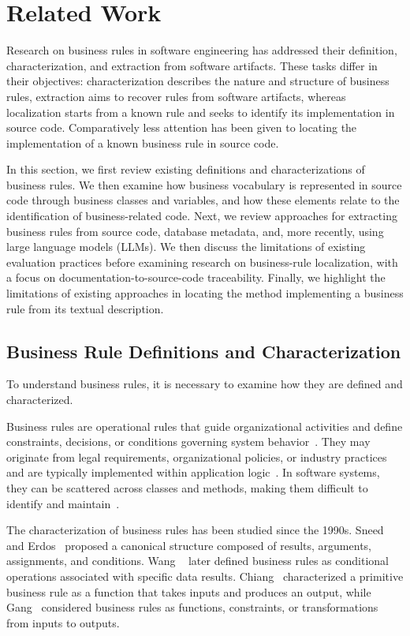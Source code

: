 \section{Related Work}
\label{sec:relatedWork}

Research on business rules in software engineering has addressed their definition, characterization, and extraction from software artifacts. These tasks differ in their objectives: characterization describes the nature and structure of business rules, extraction aims to recover rules from software artifacts, whereas localization starts from a known rule and seeks to identify its implementation in source code. Comparatively less attention has been given to locating the implementation of a known business rule in source code.

In this section, we first review existing definitions and characterizations of business rules. We then examine how business vocabulary is represented in source code through business classes and variables, and how these elements relate to the identification of business-related code. Next, we review approaches for extracting business rules from source code, database metadata, and, more recently, using large language models (LLMs). We then discuss the limitations of existing evaluation practices before examining research on business-rule localization, with a focus on documentation-to-source-code traceability. Finally, we highlight the limitations of existing approaches in locating the method implementing a business rule from its textual description.

\subsection{Business Rule Definitions and Characterization}

To understand business rules, it is necessary to examine how they are defined and characterized.

Business rules are operational rules that guide organizational activities and define constraints, decisions, or conditions governing system behavior~\cite{Huan96a}. They may originate from legal requirements, organizational policies, or industry practices and are typically implemented within application logic~\cite{Wang08b}. In software systems, they can be scattered across classes and methods, making them difficult to identify and maintain~\cite{Cose13a}.

The characterization of business rules has been studied since the 1990s. Sneed and Erdos~\cite{Snee96a} proposed a canonical structure composed of results, arguments, assignments, and conditions. Wang \etal~\cite{Wang08b,Wang04b,Wang04a} later defined business rules as conditional operations associated with specific data results. Chiang~\cite{Chia06a} characterized a primitive business rule as a function that takes inputs and produces an output, while Gang~\cite{Gang09a} considered business rules as functions, constraints, or transformations from inputs to outputs.

